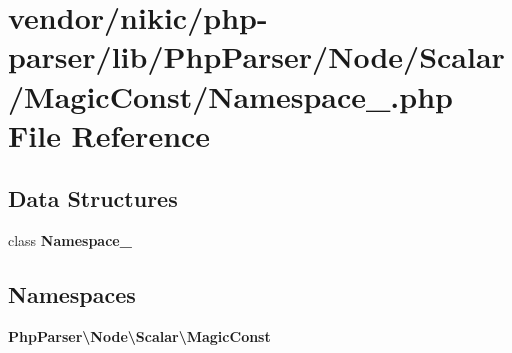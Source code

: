 \section{vendor/nikic/php-\/parser/lib/\+Php\+Parser/\+Node/\+Scalar/\+Magic\+Const/\+Namespace\+\_\+.php File Reference}
\label{_node_2_scalar_2_magic_const_2_namespace___8php}
\subsection*{Data Structures}
\begin{DoxyCompactItemize}
\item 
class {\bf Namespace\+\_\+}
\end{DoxyCompactItemize}
\subsection*{Namespaces}
\begin{DoxyCompactItemize}
\item 
 {\bf Php\+Parser\textbackslash{}\+Node\textbackslash{}\+Scalar\textbackslash{}\+Magic\+Const}
\end{DoxyCompactItemize}
